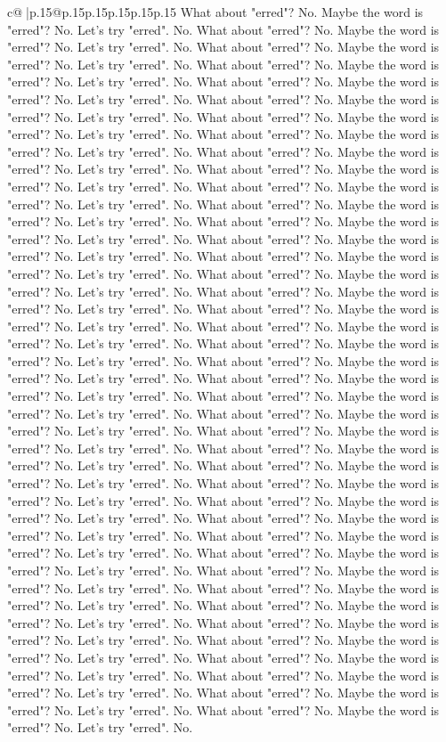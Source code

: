 \documentclass{article}
\begin{document}
{\begin{supertabular}{c@{$\;$}|p{.15\linewidth}@{}p{.15\linewidth}p{.15\linewidth}p{.15\linewidth}p{.15\linewidth}p{.15\linewidth}}
{{{What about "erred"? No. Maybe the word is "erred"? No. Let's try "erred". No. What about "erred"? No. Maybe the word is "erred"? No. Let's try "erred". No. What about "erred"? No. Maybe the word is "erred"? No. Let's try "erred". No. What about "erred"? No. Maybe the word is "erred"? No. Let's try "erred". No. What about "erred"? No. Maybe the word is "erred"? No. Let's try "erred". No. What about "erred"? No. Maybe the word is "erred"? No. Let's try "erred". No. What about "erred"? No. Maybe the word is "erred"? No. Let's try "erred". No. What about "erred"? No. Maybe the word is "erred"? No. Let's try "erred". No. What about "erred"? No. Maybe the word is "erred"? No. Let's try "erred". No. What about "erred"? No. Maybe the word is "erred"? No. Let's try "erred". No. What about "erred"? No. Maybe the word is "erred"? No. Let's try "erred". No. What about "erred"? No. Maybe the word is "erred"? No. Let's try "erred". No. What about "erred"? No. Maybe the word is "erred"? No. Let's try "erred". No. What about "erred"? No. Maybe the word is "erred"? No. Let's try "erred". No. What about "erred"? No. Maybe the word is "erred"? No. Let's try "erred". No. What about "erred"? No. Maybe the word is "erred"? No. Let's try "erred". No. What about "erred"? No. Maybe the word is "erred"? No. Let's try "erred". No. What about "erred"? No. Maybe the word is "erred"? No. Let's try "erred". No. What about "erred"? No. Maybe the word is "erred"? No. Let's try "erred". No. What about "erred"? No. Maybe the word is "erred"? No. Let's try "erred". No. What about "erred"? No. Maybe the word is "erred"? No. Let's try "erred". No. What about "erred"? No. Maybe the word is "erred"? No. Let's try "erred". No. What about "erred"? No. Maybe the word is "erred"? No. Let's try "erred". No. What about "erred"? No. Maybe the word is "erred"? No. Let's try "erred". No. What about "erred"? No. Maybe the word is "erred"? No. Let's try "erred". No. What about "erred"? No. Maybe the word is "erred"? No. Let's try "erred". No. What about "erred"? No. Maybe the word is "erred"? No. Let's try "erred". No. What about "erred"? No. Maybe the word is "erred"? No. Let's try "erred". No. What about "erred"? No. Maybe the word is "erred"? No. Let's try "erred". No. What about "erred"? No. Maybe the word is "erred"? No. Let's try "erred". No. What about "erred"? No. Maybe the word is "erred"? No. Let's try "erred". No. What about "erred"? No. Maybe the word is "erred"? No. Let's try "erred". No. What about "erred"? No. Maybe the word is "erred"? No. Let's try "erred". No. What about "erred"? No. Maybe the word is "erred"? No. Let's try "erred". No. What about "erred"? No. Maybe the word is "erred"? No. Let's try "erred". No. What about "erred"? No. Maybe the word is "erred"? No. Let's try "erred". No. What about "erred"? No. Maybe the word is "erred"? No. Let's try "erred". No. What about "erred"? No. Maybe the word is "erred"? No. Let's try "erred". No. What about "erred"? No. Maybe the word is "erred"? No. Let's try "erred". No. What about "erred"? No. Maybe the word is "erred"? No. Let's try "erred". No. What about "erred"? No. Maybe the word is "erred"? No. Let's try "erred". No. }}}
\end{supertabular}}
\end{document}
